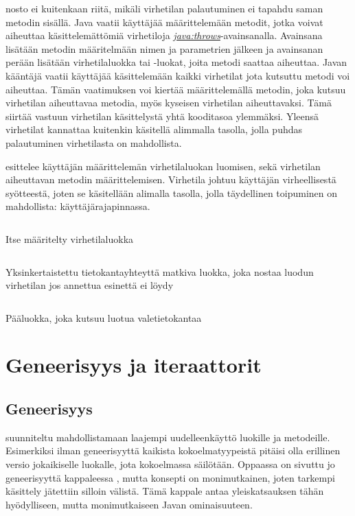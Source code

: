 \documentclass{tufte-book}
\newcommand{\java}[1]{\underline{\gls{java:#1}}}
\newcommand{\newjava}[1]{\textit{\java{#1}}}
\newcommand{\code}[3]{
\begin{listing}
    \inputminted{java}{OhjelmointiopasEsimerkit/src/#1/#2.java}
    \caption{#3}
    \label{Java-#1-#2}
\end{listing}
}
\begin{document}
 nosto ei kuitenkaan riitä, mikäli virhetilan palautuminen ei
tapahdu saman metodin sisällä. Java vaatii käyttäjää määrittelemään metodit, jotka voivat
aiheuttaa käsittelemättömiä virhetiloja \newjava{throws}-avainsanalla. Avainsana lisätään metodin
määritelmään nimen ja parametrien jälkeen ja avainsanan perään lisätään virhetilaluokka tai 
-luokat, joita metodi saattaa aiheuttaa. Javan kääntäjä vaatii käyttäjää käsittelemään kaikki
virhetilat jota kutsuttu metodi voi aiheuttaa. Tämän vaatimuksen voi kiertää määrittelemällä
metodin, joka kutsuu virhetilan aiheuttavaa metodia, myös kyseisen virhetilan aiheuttavaksi. Tämä
siirtää vastuun virhetilan käsittelystä yhtä kooditasoa ylemmäksi. Yleensä virhetilat kannattaa
kuitenkin käsitellä alimmalla tasolla, jolla puhdas palautuminen virhetilasta on mahdollista.

 esittelee käyttäjän määrittelemän virhetilaluokan luomisen,
sekä virhetilan aiheuttavan metodin määrittelemisen. Virhetila johtuu käyttäjän virheellisestä
syötteestä, joten se käsitellään alimalla tasolla, jolla täydellinen toipuminen on mahdollista:
käyttäjärajapinnassa.

\code{week9/exceptionexample}{NoDatabaseEntryException}{Itse määritelty virhetilaluokka}
\code{week9/exceptionexample}{DatabaseConnection}{Yksinkertaistettu tietokantayhteyttä matkiva
luokka, joka nostaa luodun virhetilan jos annettua esinettä ei löydy}
\code{week9/exceptionexample}{ExceptionExample}{Pääluokka, joka kutsuu luotua valetietokantaa}


\chapter{Geneerisyys ja iteraattorit}
\label{generic+iterator}

\section{Geneerisyys}
\label{generic}

 suunniteltu mahdollistamaan laajempi uudelleenkäyttö luokille ja
metodeille. Esimerkiksi ilman geneerisyyttä kaikista kokoelmatyypeistä pitäisi olla erillinen
versio jokaikiselle luokalle, jota kokoelmassa säilötään. Oppaassa on sivuttu jo geneerisyyttä
kappaleessa , mutta konsepti on monimutkainen, joten tarkempi käsittely
jätettiin silloin välistä. Tämä kappale antaa yleiskatsauksen tähän hyödylliseen, mutta
monimutkaiseen Javan ominaisuuteen.
\end{document}
